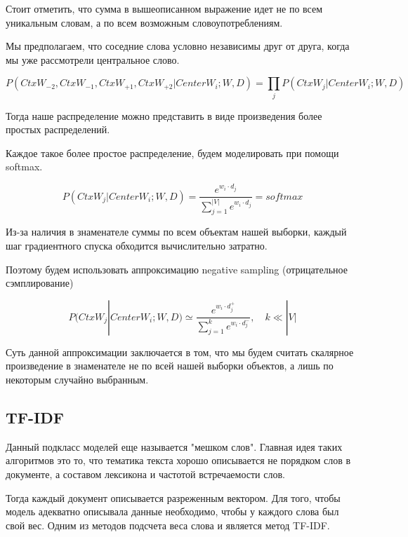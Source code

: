Стоит отметить, что сумма в вышеописанном выражение идет не по всем уникальным словам, а по всем возможным словоупотреблениям.
    
Мы предполагаем, что соседние слова условно независимы друг от друга, когда мы уже рассмотрели центральное слово. 

\begin{equation}
	P(CtxW_{-2}, CtxW_{-1}, CtxW_{+1}, CtxW_{+2} | CenterW_i; W, D) = \prod_j P(CtxW_j | CenterW_i; W, D)
\end{equation}

Тогда наше распределение можно представить в виде произведения более простых распределений.

Каждое такое более простое распределение, будем моделировать при помощи softmax.


\begin{equation}
	P(CtxW_j | CenterW_i; W, D) = \frac{e^{w_i \cdot d_j}} { \sum_{j=1}^{|V|} e^{w_i \cdot d_j}} = softmax
\end{equation}


Из-за наличия в знаменателе суммы по всем объектам нашей выборки, каждый шаг градиентного спуска обходится вычислительно затратно. 
     
Поэтому будем использовать аппроксимацию negative sampling (отрицательное сэмплирование)

\begin{equation}
	P(CtxW_j | CenterW_i; W, D) \simeq \frac{e^{w_i \cdot d_j^+}} { \sum_{j=1}^{k} e^{w_i \cdot d_j^-}}, \quad k \ll |V|
\end{equation}


Суть данной аппроксимации заключается в том, что мы будем считать скалярное произведение в знаменателе не по всей нашей выборки объектов, а лишь по некоторым случайно выбранным.

\subsection{TF-IDF}

Данный подкласс моделей еще называется "мешком слов". Главная идея таких алгоритмов это то, что тематика текста хорошо описывается не порядком слов в документе, а
составом лексикона и частотой встречаемости слов.

Тогда каждый документ описывается разреженным вектором.
Для того, чтобы модель адекватно описывала данные необходимо, чтобы у каждого слова был свой вес. Одним из методов подсчета веса слова и является метод TF-IDF.

